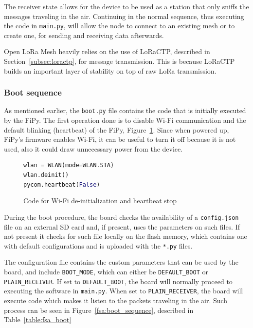 				The receiver state allows for the device to be used as a station that only sniffs the messages traveling in the air.				
				Continuing in the normal sequence, thus executing the code in \texttt{main.py}, will allow the node to connect to an existing mesh or to create one, for sending and receiving data afterwards.
				
				Open LoRa Mesh heavily relies on the use of LoRaCTP, described in Section~\ref{subsec:loractp}, for message transmission.
				This is because LoRaCTP builds an important layer of stability on top of raw LoRa transmission.
				
			\subsubsection{Boot sequence}
			
				As mentioned earlier, the \texttt{boot.py} file contains the code that is initially executed by the FiPy.
				The first operation done is to disable Wi-Fi communication and the default blinking (heartbeat) of the FiPy, Figure~\ref{code:boot_wifi}.
				Since when powered up, FiPy's firmware enables Wi-Fi, it can be useful to turn it off because it is not used, also it could draw unnecessary power from the device.

				\begin{figure}[H]
					\begin{lstlisting}[language=Python]
wlan = WLAN(mode=WLAN.STA)
wlan.deinit()
pycom.heartbeat(False)
					\end{lstlisting}
					\caption{Code for Wi-Fi de-initialization and heartbeat stop}
					\label{code:boot_wifi}
				\end{figure}
			
				During the boot procedure, the board checks the availability of a \texttt{config.json} file on an external SD card and, if present, uses the parameters on such files.
				If not present it checks for such file locally on the flash memory, which contains one with default configurations and is uploaded with the \texttt{*.py} files.

				The configuration file contains the custom parameters that can be used by the board, and
				include \texttt{BOOT\_MODE}, which can either be \texttt{DEFAULT\_BOOT} or \texttt{PLAIN\_RECEIVER}.
				If set to \texttt{DEFAULT\_BOOT}, the board will normally proceed to executing the software in \texttt{main.py}.
				When set to \texttt{PLAIN\_RECEIVER}, the board will execute code which makes it listen to the packets traveling in the air.
				Such process can be seen in Figure~\ref{fsa:boot_sequence}, described in Table~\ref{table:fsa_boot}
				
